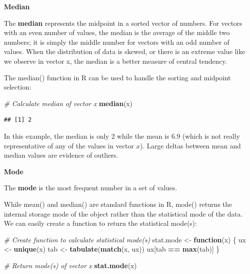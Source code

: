 \documentclass[]{book}
\newenvironment{Shaded}{\begin{snugshade}}{\end{snugshade}}
\newcommand{\CommentTok}[1]{\textcolor[rgb]{0.56,0.35,0.01}{\textit{#1}}}
\newcommand{\ControlFlowTok}[1]{\textcolor[rgb]{0.13,0.29,0.53}{\textbf{#1}}}
\newcommand{\KeywordTok}[1]{\textcolor[rgb]{0.13,0.29,0.53}{\textbf{#1}}}
\newcommand{\NormalTok}[1]{#1}
\newcommand{\OperatorTok}[1]{\textcolor[rgb]{0.81,0.36,0.00}{\textbf{#1}}}
\newcommand{\StringTok}[1]{\textcolor[rgb]{0.31,0.60,0.02}{#1}}
\begin{document}
\textbf{Median}

The \textbf{median} represents the midpoint in a sorted vector of numbers. For vectors with an even number of values, the median is the average of the middle two numbers; it is simply the middle number for vectors with an odd number of values. When the distribution of data is skewed, or there is an extreme value like we observe in vector x, the median is a better measure of central tendency.

The median() function in R can be used to handle the sorting and midpoint selection:

\begin{Shaded}
\begin{Highlighting}[]
\CommentTok{# Calculate median of vector x}
\KeywordTok{median}\NormalTok{(x)}
\end{Highlighting}
\end{Shaded}

\begin{verbatim}
## [1] 2
\end{verbatim}

In this example, the median is only 2 while the mean is 6.9 (which is not really representative of any of the values in vector \(x\)). Large deltas between mean and median values are evidence of outliers.

\textbf{Mode}

The \textbf{mode} is the most frequent number in a set of values.

While mean() and median() are standard functions in R, mode() returns the internal storage mode of the object rather than the statistical mode of the data. We can easily create a function to return the statistical mode(s):

\begin{Shaded}
\begin{Highlighting}[]
\CommentTok{# Create function to calculate statistical mode(s)}
\NormalTok{stat.mode <-}\StringTok{ }\ControlFlowTok{function}\NormalTok{(x) \{}
\NormalTok{  ux <-}\StringTok{ }\KeywordTok{unique}\NormalTok{(x)}
\NormalTok{  tab <-}\StringTok{ }\KeywordTok{tabulate}\NormalTok{(}\KeywordTok{match}\NormalTok{(x, ux))}
\NormalTok{  ux[tab }\OperatorTok{==}\StringTok{ }\KeywordTok{max}\NormalTok{(tab)]}
\NormalTok{\}}

\CommentTok{# Return mode(s) of vector x}
\KeywordTok{stat.mode}\NormalTok{(x)}
\end{Highlighting}
\end{Shaded}
\end{document}
